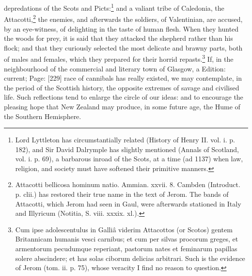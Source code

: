 depredations of the Scots and Picts:\footnote{Lord Lyttleton has circumstantially related (History of Henry II. vol. i. p. 182), and Sir David Dalrymple has slightly mentioned (Annals of Scotland, vol. i. p. 69), a barbarous inroad of the Scots, at a time (ad 1137) when law, religion, and society must have softened their primitive manners.} and a valiant tribe of Caledonia, the Attacotti,\footnote{Attacotti bellicosa hominum natio. Ammian. xxvii. 8. Cambden (Introduct. p. clii.) has restored their true name in the text of Jerom. The bands of Attacotti, which Jerom had seen in Gaul, were afterwards stationed in Italy and Illyricum (Notitia, S. viii. xxxix. xl.).} the enemies, and afterwards the soldiers, of Valentinian, are accused, by an eye-witness, of delighting in the taste of human flesh. When they hunted the woods for prey, it is said that they attacked the shepherd rather than his flock; and that they curiously selected the most delicate and brawny parts, both of males and females, which they prepared for their horrid repasts.\footnote{Cum ipse adolescentulus in Galliâ viderim Attacottos (or Scotos) gentem Britannicam humanis vesci carnibus; et cum per silvas procorum greges, et armentorum pecudumque reperiant, pastorum nates et feminarum papillas solere abscindere; et has solas ciborum delicias arbitrari. Such is the evidence of Jerom (tom. ii. p. 75), whose veracity I find no reason to question.} If, in the neighbourhood of the commercial and literary town of Glasgow, a Edition: current; Page: [229] race of cannibals has really existed, we may contemplate, in the period of the Scottish history, the opposite extremes of savage and civilised life. Such reflections tend to enlarge the circle of our ideas: and to encourage the pleasing hope that New Zealand may produce, in some future age, the Hume of the Southern Hemisphere.


